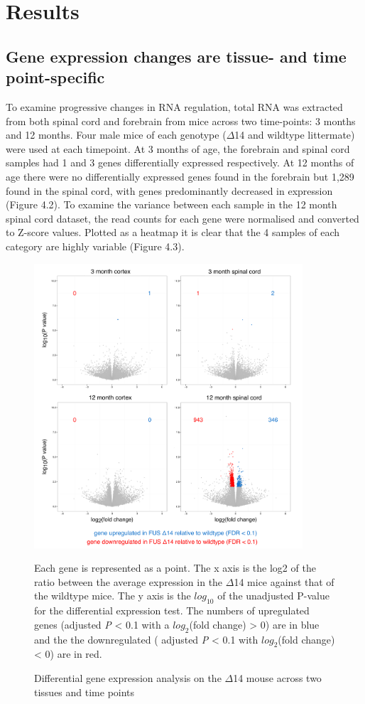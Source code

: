\section{Results}

\subsection{Gene expression changes are tissue- and time point-specific}

To examine progressive changes in RNA regulation, total RNA was extracted from both spinal cord and forebrain from mice across two time-points: 3 months and 12 months. Four male mice of each genotype ($\Delta$14 and wildtype littermate) were used at each timepoint. At 3 months of age, the forebrain and spinal cord samples had 1 and 3 genes differentially expressed respectively. At 12 months of age there were no differentially expressed genes found in the forebrain but 1,289 found in the spinal cord, with genes predominantly decreased in expression (Figure 4.2). To examine the variance between each sample in the 12 month spinal cord dataset, the read counts for each gene were normalised and converted to Z-score values. Plotted as a heatmap it is clear that the 4 samples of each category are highly variable (Figure 4.3).

\begin{figure}[h!]
	\begin{center}
		\includegraphics[width=10cm]{Figures/04_fus_mice/anny_volcanos.png}
	\end{center}
	\caption{Differential gene expression analysis on the $\Delta$14 mouse across two tissues and time points}
	Each gene is represented as a point. The x axis is the log2 of the ratio between the average expression in the $\Delta$14 mice against that of the wildtype mice. The y axis is the $log_10$ of the unadjusted P-value for the differential expression test. The numbers of upregulated genes (adjusted \textit{P} < 0.1 with a $log_2$(fold change) > 0) are in blue and the the downregulated ( adjusted \textit{P} < 0.1 with $log_2$(fold change) < 0) are in red.
\end{figure}

